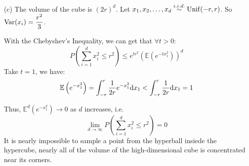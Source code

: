 \begin{homeworkProblem}
(c) The volume of the cube is $(2r)^d$. Let $x_1, x_2, \dots, x_d\stackrel{i.i.d.}{\sim}\operatorname{Unif}(-r, r)$. So $\mathrm{Var}(x_i) = \dfrac{r^2}{3}$.

With the Chebyshev's Inequality, we can get that $\forall t > 0$:
$$P\left( \sum_{i=1}^d x_i^2 \leq r^2 \right) \leq e^{t r^2} \left( \mathbb{E}(e^{-t x_1^2}) \right)^d$$
Take $t=1$, we have:
$$\mathbb{E}\left(e^{-x_1^2}\right) = \int_{-r}^{r} \frac{1}{2r} e^{-x_1^2} \mathrm{d}x_1 < \int_{-r}^{r} \frac{1}{2r} \mathrm{d}x_1 = 1$$

Thus, $\mathbb{E}^d\left(e^{-x_1^2}\right)\to 0$ as $d$ increases, i.e.
$$\lim_{d \to \infty} P\left( \sum_{i=1}^d x_i^2 \leq r^2 \right) = 0$$
It is nearly impossible to sample a point from the hyperball insiede the hypercube, nearly all of the volume of the high-dimensional cube is concentrated near its corners.

\end{homeworkProblem}

\newpage